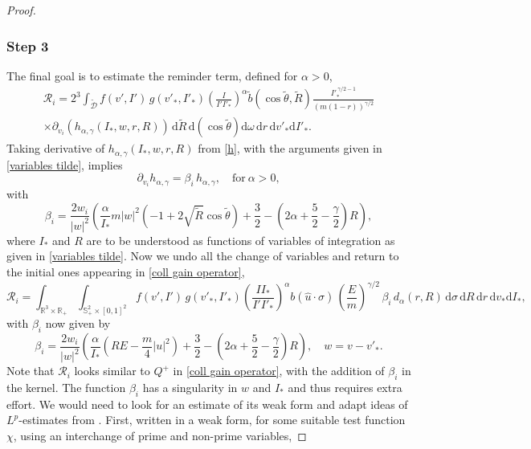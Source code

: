 \documentclass[11pt,a4paper]{amsart}
\newcommand{\bRp}{\mathbb{R}_+}
\newcommand{\bRfp}{\mathbb{R}^3 \times \bRp}
\newcommand{\bSp}{\mathbb{S}^2_+}
\newcommand{\md}{\mathrm{d}}
\newcommand{\dpo}{d_\alpha(r,R)}
\newcommand{\g}{\gamma}
\newcommand{\Dt}{\tilde{\mathcal{D}}}
\newcommand{\E}{\left(\frac{E}{m}\right)}
\newcommand{\hag}{h_{\alpha,\g}}
\newcommand{\kk}{\beta}
\newcommand{\domparam}{\bSp \times [0,1]^2}
\newcommand{\istarintro}{\int_{\bRfp}\int_{\domparam }}
\newcommand{\dstar}{ \md \sigma \, \md R \, \md r \, \md v_* \md I_*}
\newcommand{\dstartilde}{ \md \tilde{R} \, \md(\cos \tilde{\theta}) \md \omega \, \md r \, \md v'_* \md I'_*}
\newcommand{\R}{\mathcal{R}}
\begin{document}
\begin{proof}
\subsubsection*{Step 3} The final goal is to  estimate   the reminder term, defined for $\alpha>0$,
	\begin{multline}\label{coll gain operator tilde 2}
\R_i = 2^3 \int_{	\Dt}  f(v',I') \, g(v'_*,I'_*) \left(\frac{I }{I' I'_* }\right)^{\alpha}  \tilde{b}(\cos\tilde{\theta},\tilde{R})    \frac{I'^{\,\g/2-1}_*}{(m(1-r))^{\g/2}} \\ \times \partial_{v_i} \left(	\hag(I_*, w, r, R) \right) \, \dstartilde.
\end{multline}
Taking derivative of $\hag(I_*, w, r, R)$  from \eqref{h}, with the arguments given in \eqref{variables tilde}, implies
\begin{equation*}
\partial_{v_i}  	\hag  =   \kk_i \,	\hag, \quad \text{for} \  \alpha>0,
\end{equation*}
with
\begin{equation}
	\kk_i = \frac{2 w_i}{|w|^2} \left(  \frac{\alpha}{ I_*} m |w|^2 \left( -1 + 2 \sqrt{\tilde{R}} \cos\tilde{\theta}  \right) + \frac{3}{2} - \left( 2 \alpha +\frac{5}{2} - \frac{\g}{2} \right) R   \right),
\label{add 1}
\end{equation}
where   $I_*$ and $R$   are to be understood as functions of variables of integration as given in \eqref{variables tilde}. 
Now we undo all the change of variables and return to the initial ones appearing in \eqref{coll gain operator}, 
	\begin{equation}\label{coll gain operator 2}
\R_i =\istarintro  f(v',I')\,g(v'_*,I'_*) \left(\frac{I I_*}{I' I'_* }\right)^{\alpha}      b(\hat{u}\cdot\sigma) \, \E^{\g/2} \, \kk_i \, \dpo  \, 	\dstar,
\end{equation}
with $\kk_i$ now given by 
\begin{equation}
\kk_i	= \frac{2 w_i}{|w|^2} \left(  \frac{\alpha}{  I_*} \left(R E - \frac{m}{4}|u|^2\right)  + \frac{3}{2} - \left( 2 \alpha +\frac{5}{2} - \frac{\g}{2} \right) R   \right), \quad w = v-v'_*. \label{add 2}
\end{equation}
 Note that $\R_i$ looks similar to $Q^+$ in \eqref{coll gain operator}, with the addition of $\kk_i$ in the kernel. The function $\kk_i$ has a singularity in $w$ and $I_*$ and thus requires  extra effort. We would need to look for an estimate of its weak form and adapt ideas of $L^p$-estimates from \cite{MC-Alonso-Lp}. First, written in a weak form, for some suitable test function $\chi$, using an  interchange of prime and non-prime variables, 

\end{proof}
\end{document}
